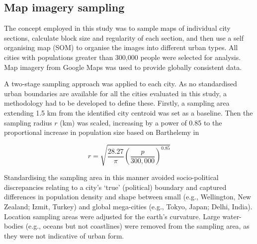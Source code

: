 \documentclass[9pt,twocolumn,twoside,lineno]{pnas-new}
\begin{document}
\matmethods
{





\subsection*{Map imagery sampling}\label{sec:methods2}
The concept employed in this study was to sample maps of individual city sections, calculate block size and regularity of each section, and then use a self organising map (SOM) to organise the images into different urban types. All cities with populations greater than 300,000 people\cite{UN2014} were selected for analysis. Map imagery from Google Maps\cite{GoogleStatic2017} was used to provide globally consistent data. 

A two-stage sampling approach was applied to each city. As no standardised urban boundaries are available for all the cities evaluated in this study, a methodology had to be developed to define these. Firstly, a sampling area extending 1.5 km from the identified city centroid\cite{UN2014} was set as a baseline. Then the sampling radius $r$ (km) was scaled, increasing by a power of 0.85 to the proportional increase in population size based on Barthelemy\cite{Barthelemy2016} in 

\begin{equation}
r = \sqrt{ \frac{28.27}{\pi} \left( \frac{p}{300,000} \right) ^{0.85} }
\end{equation}


Standardising the sampling area in this manner avoided socio-political discrepancies relating to a city's `true' (political) boundary and captured differences in population density and shape between small (e.g., Wellington, New Zealand; Izmit, Turkey) and global mega-cities (e.g., Tokyo, Japan; Delhi, India). Location sampling areas were adjusted for the earth's curvature\cite{Sinnott1984}. Large water-bodies (e.g., oceans but not coastlines) were removed from the sampling area, as they were not indicative of urban form. 

}
\end{document}
